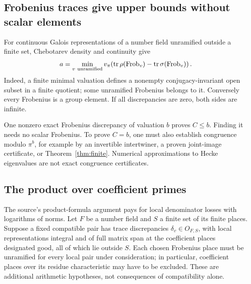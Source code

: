 \subsection{Frobenius traces give upper bounds without scalar elements}

For continuous Galois representations of a number field unramified
outside a finite set, Chebotarev density and continuity give
\begin{equation}
\label{eq:frobdepth}
 a=\min_{v\ {\rm unramified}}
 v_\pi\!\left(\operatorname{tr}\rho(\mathrm{Frob}_v)
             -\operatorname{tr}\sigma(\mathrm{Frob}_v)\right).
\end{equation}
Indeed, a finite minimal valuation defines a nonempty conjugacy-invariant
open subset in a finite quotient; some unramified Frobenius belongs to it.
Conversely every Frobenius is a group element. If all discrepancies are
zero, both sides are infinite.

One nonzero exact Frobenius discrepancy of valuation \(b\) proves
\(C\leq b\). Finding it needs no scalar Frobenius. To prove \(C=b\), one
must also establish congruence modulo \(\pi^b\), for example by an
invertible intertwiner, a proven joint-image certificate, or
Theorem~\ref{thm:finite}. Numerical approximations to Hecke eigenvalues are
not exact congruence certificates.

\subsection{The product over coefficient primes}
\label{sec:ideal}

The source's product-formula argument pays for local denominator losses
with logarithms of norms. Let \(F\) be a number field and \(S\) a finite
set of its finite places. Suppose a fixed compatible pair has trace
discrepancies \(\delta_v\in O_{F,S}\), with local representations integral
and of full matrix span at the coefficient places designated good,
all of which lie outside \(S\). Each chosen Frobenius place must be
unramified for every local pair under consideration; in particular,
coefficient places over its residue characteristic may have to be excluded.
These are additional arithmetic hypotheses, not consequences of
compatibility alone.

